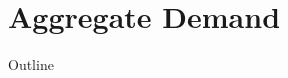 \documentclass{beamer}
\newcommand{\tb}[1]{{\color{blue}{\textbf{#1}}}}
\newenvironment{mytemize}
{\vfill\itemize[nolistsep,itemsep=\fill,label=\color{blue}{$\triangleright$}]}
  {\enditemize}
\begin{document}
\section{Aggregate Demand}
\begin{frame}{Outline}
\tableofcontents[currentsection]
\end{frame}
%
%
%
%
%
\end{document}
